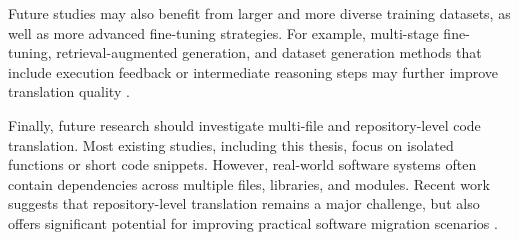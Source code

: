Future studies may also benefit from larger and more diverse training datasets,
as well as more advanced fine-tuning strategies. For example, multi-stage
fine-tuning, retrieval-augmented generation, and dataset generation methods
that include execution feedback or intermediate reasoning steps may further
improve translation quality \cite{chen2025dialogue, zhu2022xlcost}.

Finally, future research should investigate multi-file and repository-level code
translation. Most existing studies, including this thesis, focus on isolated
functions or short code snippets. However, real-world software systems often
contain dependencies across multiple files, libraries, and modules. Recent work
suggests that repository-level translation remains a major challenge, but also
offers significant potential for improving practical software migration
scenarios \cite{zhang2025repository, bruneel2025pipeline}.